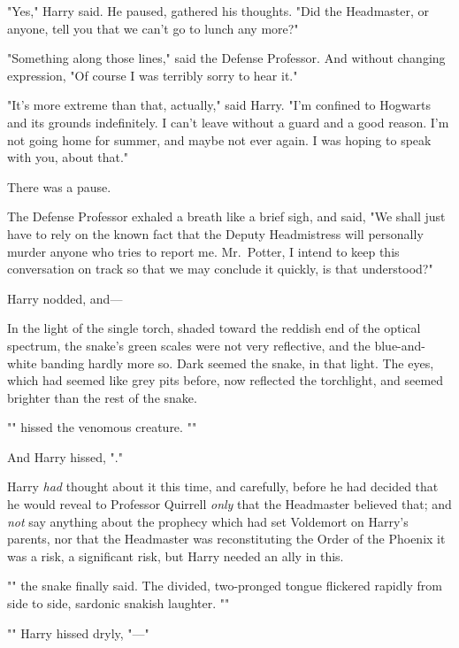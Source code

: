 "Yes," Harry said. He paused, gathered his thoughts. "Did the Headmaster, or
anyone, tell you that we can't go to lunch any more?"

"Something along those lines," said the Defense Professor. And without changing
expression, "Of course I was terribly sorry to hear it."

"It's more extreme than that, actually," said Harry. "I'm confined to Hogwarts
and its grounds indefinitely. I can't leave without a guard and a good reason.
I'm not going home for summer, and maybe not ever again. I was hoping{\el}
to speak with you, about that."

There was a pause.

The Defense Professor exhaled a breath like a brief sigh, and said, "We shall
just have to rely on the known fact that the Deputy Headmistress will
personally murder anyone who tries to report me. Mr.~Potter, I intend to keep
this conversation on track so that we may conclude it quickly, is that
understood?"

Harry nodded, and---

In the light of the single torch, shaded toward the reddish end of the optical
spectrum, the snake's green scales were not very reflective, and the
blue-and-white banding hardly more so. Dark seemed the snake, in that light.
The eyes, which had seemed like grey pits before, now reflected the torchlight,
and seemed brighter than the rest of the snake.

"" hissed the venomous creature. ""

And Harry hissed, "."

Harry \emph{had} thought about it this time, and carefully, before he had
decided that he would reveal to Professor Quirrell \emph{only} that the
Headmaster believed that; and \emph{not} say anything about the prophecy which
had set Voldemort on Harry's parents, nor that the Headmaster was
reconstituting the Order of the Phoenix{\el} it was a risk, a significant
risk, but Harry needed an ally in this.

"" the snake finally said. The divided,
two-pronged tongue flickered rapidly from side to side, sardonic snakish
laughter. ""

"" Harry hissed dryly, "\mbox{---}"

